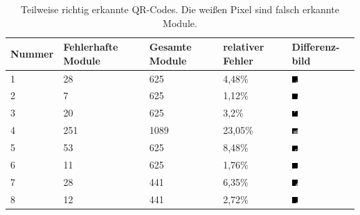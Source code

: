 \documentclass[a4paper, oneside, 12pt]{article}
\begin{document}
\begin{table}[h]
\centering
\begin{tabular}{ | p{} | p{} | p{} | p{} | p{} |}
	\hline
    \textbf{Nummer} & \textbf{Fehlerhafte Module} & \textbf{Gesamte Module} & \textbf{relativer Fehler} & \textbf{Differenz-bild} \\
	\hline
	1 & 28 & 625 & 4,48\% & \includegraphics[width=0.1\textwidth]{images/amazon_2.png}\\
	\hline
	2 & 7 & 625 & 1,12\% & \includegraphics[width=0.1\textwidth]{images/facebook_2.png}\\
	\hline
	3 & 20 & 625 & 3,2\% & \includegraphics[width=0.1\textwidth]{images/google_2.png}\\
	\hline
	4 & 251 & 1089 & 23,05\% & \includegraphics[width=0.1\textwidth]{images/hallo_3.png}\\
	\hline
	5 & 53 & 625 & 8,48\% & \includegraphics[width=0.1\textwidth]{images/reddit_1.png}\\	
	\hline
	6 & 11 & 625 & 1,76\% & \includegraphics[width=0.1\textwidth]{images/reddit_2.png}\\	
	\hline
	7 & 28 & 441 & 6,35\% & \includegraphics[width=0.1\textwidth]{images/test1_2.png}\\	
	\hline
	8 & 12 & 441 & 2,72\% & \includegraphics[width=0.1\textwidth]{images/test2_2.png}\\	
	\hline
\end{tabular}
\caption{Teilweise richtig erkannte QR-Codes. Die weißen Pixel sind falsch erkannte Module.}
\label{tab:teilweiseKorrekt}
\end{table}
\end{document}
